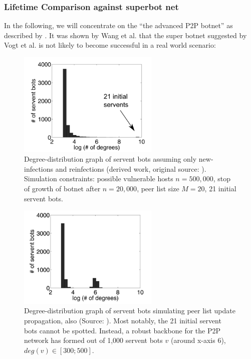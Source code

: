 \documentclass{llncs}
\begin{document}
\subsubsection{Lifetime Comparison against superbot net}

In the following, we will concentrate on the ``the advanced P2P
botnet'' as described by \cite{td1sc}. It was shown by Wang et
al. \cite{td1sc} that the super botnet suggested by Vogt et al. is not
likely to become successful in a real world scenario:

\begin{figure}[htbp]
  \centering
  
    \includegraphics[width=0.6\textwidth]{figures/distributiongraph.png}
  
  \caption{Degree-distribution graph of servent bots assuming only new-infections and reinfections (derived work, original source: \cite{td1sc}). Simulation constraints: possible vulnerable hosts $n=500,000$, stop of growth of botnet after $n=20,000$, peer list size $M=20$, 21 initial servent bots.}
  \label{distributiongraph}
\end{figure}

\begin{figure}[htbp]
  \centering
  
    \includegraphics[width=0.6\textwidth]{figures/distributiongraph2.png}
  
  \caption{Degree-distribution graph of servent bots simulating peer list update propagation, also (Source: \cite{td1sc}). Most notably, the 21 initial servent bots cannot be spotted. Instead, a robust backbone for the P2P network has formed out of 1,000 servent bots $v$ (around x-axis 6), $deg(v) \in [300;500]$.}
  \label{distributiongraph2}
\end{figure}
\end{document}
